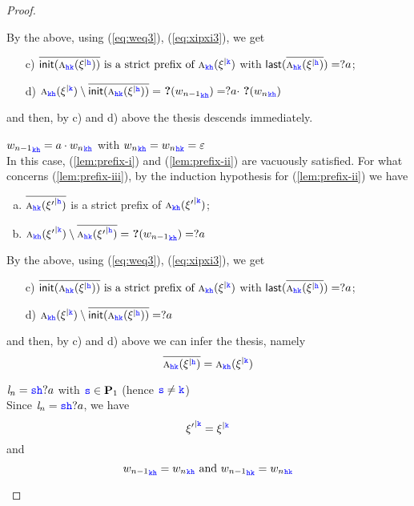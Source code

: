 \begin{proof}
\begin{description}
\begin{description}
     By the above, using  (\ref{eq:weq3}), (\ref{eq:xipxi3}), we  get
\begin{itemize}
\item[c)]
\label{l:cc}
$\Dual{\init(\symb{\HH\KK}{\restrictup{\xi}{\HH}})}
\text{ is a strict prefix of }
\symb{\KK\HH}{\restrictup{\xi}{\KK}}$
with $\last(\Dual{\symb{\HH\KK}{\restrictup{\xi}{\HH}}})= ?a$;
\item[d)]
\label{l:dd}
$\symb{\KK\HH}{\restrictup{\xi}{\KK}}\setminus \Dual{\init(\symb{\HH\KK}{\restrictup{\xi}{\HH}})} =  \qm({w_{n-1}}_{\KK\HH}) =?a\cdot\qm({{w_{n}}_{\KK\HH}})$
\end{itemize}

and then, by c) and  d) above  the thesis descends immediately.

\item
      ${w_{n-1}}_{\KK\HH} = a\cdot {w_{n}}_{\KK\HH}$ with ${w_{n}}_{\KK\HH}={w_{n}}_{\HH\KK} = \varepsilon$\\
In this case, (\ref{lem:prefix-i})  and (\ref{lem:prefix-ii}) are vacuously satisfied. For what concerns
(\ref{lem:prefix-iii}),
by the induction hypothesis for (\ref{lem:prefix-ii}) we have
\begin{enumerate}[a)]
\item 
\label{l:aa}
$\Dual{\symb{\HH\KK}{\restrictup{\xi'}{\HH}}}$
 is a strict prefix of
$\symb{\KK\HH}{\restrictup{\xi'}{\KK}}$;
\item
\label{l:bb}
$\symb{\KK\HH}{\restrictup{\xi'}{\KK}}\setminus \Dual{\symb{\HH\KK}{\restrictup{\xi'}{\HH}}} = \qm({{w_{n-1}}_{\KK\HH}}) = ?a$
\end{enumerate}
     By the above, using  (\ref{eq:weq3}), (\ref{eq:xipxi3}), we  get
\begin{itemize}
\item[c)]
\label{l:ccc}
$\Dual{\init(\symb{\HH\KK}{\restrictup{\xi}{\HH}})}
\text{ is a strict prefix of }
\symb{\KK\HH}{\restrictup{\xi}{\KK}}$ 
with $\last(\Dual{\symb{\HH\KK}{\restrictup{\xi}{\HH}}})= ?a$;
\item[d)]
\label{l:ddd}
$\symb{\KK\HH}{\restrictup{\xi}{\KK}}\setminus\Dual{\init(\symb{\HH\KK}{\restrictup{\xi}{\HH}})} =  ?a$
\end{itemize}
and then, by c) and  d) above we can infer the thesis, namely
$$\Dual{\symb{\HH\KK}{\restrictup{\xi}{\HH}}} = 
\symb{\KK\HH}{\restrictup{\xi}{\KK}}$$

\end{description}


\item
       $\elle_n =\tts\HH?a$ with  $\tts \in \roles_1$ (hence $\tts\neq\KK$)\\
Since $\elle_n = \tts\HH?a$, we have  
\begin{equation}
\label{eq:weq2}
\restrictup{\xi'}{\KK}=\restrictup{\xi}{\KK}
\end{equation}
and 
\begin{equation}
\label{eq:weqw}
{w_{n-1}}_{\KK\HH}= {w_{n}}_{\KK\HH} \text{ and } {w_{n-1}}_{\HH\KK}= {w_{n}}_{\HH\KK}
\end{equation}


\end{description}
\end{proof}
